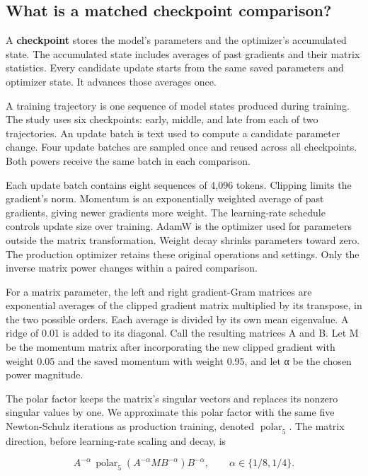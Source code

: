 \documentclass[
  14pt,
  letterpaper,
]{extarticle}
\begin{document}
\subsection{What is a matched checkpoint
comparison?}\label{what-is-a-matched-checkpoint-comparison}

A \textbf{checkpoint} stores the model's parameters and the optimizer's
accumulated state. The accumulated state includes averages of past
gradients and their matrix statistics. Every candidate update starts
from the same saved parameters and optimizer state. It advances those
averages once.

A training trajectory is one sequence of model states produced during
training. The study uses six checkpoints: early, middle, and late from
each of two trajectories. An update batch is text used to compute a
candidate parameter change. Four update batches are sampled once and
reused across all checkpoints. Both powers receive the same batch in
each comparison.

Each update batch contains eight sequences of 4,096 tokens. Clipping
limits the gradient's norm. Momentum is an exponentially weighted
average of past gradients, giving newer gradients more weight. The
learning-rate schedule controls update size over training. AdamW is the
optimizer used for parameters outside the matrix transformation. Weight
decay shrinks parameters toward zero. The production optimizer retains
these original operations and settings. Only the inverse matrix power
changes within a paired comparison.

For a matrix parameter, the left and right gradient-Gram matrices are
exponential averages of the clipped gradient matrix multiplied by its
transpose, in the two possible orders. Each average is divided by its
own mean eigenvalue. A ridge of 0.01 is added to its diagonal. Call the
resulting matrices A and B. Let M be the momentum matrix after
incorporating the new clipped gradient with weight 0.05 and the saved
momentum with weight 0.95, and let α be the chosen power magnitude.

The polar factor keeps the matrix's singular vectors and replaces its
nonzero singular values by one. We approximate this polar factor with
the same five Newton-Schulz iterations as production training, denoted
\(\operatorname{polar}_5\). The matrix direction, before learning-rate
scaling and decay, is

\[
A^{-\alpha}\,\operatorname{polar}_5\!\left(A^{-\alpha} M B^{-\alpha}\right)B^{-\alpha},
\qquad \alpha\in\{1/8,1/4\}.
\]
\end{document}
